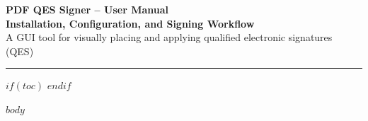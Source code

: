 \documentclass[a4paper,10pt]{article}
\begin{document}
\thispagestyle{fancy}

\begin{center}
  {\LARGE\bfseries\color{qesblue}
    PDF QES Signer -- User Manual}\\[0.5cm]
  {\large\bfseries Installation, Configuration, and Signing Workflow}\\[0.3cm]
  {\small\color{gray}
    A GUI tool for visually placing and applying qualified electronic signatures (QES)}
\end{center}
{\color{qesblue}\rule{\linewidth}{2pt}}
\vspace{0.6cm}

$if(toc)$
{
\hypersetup{linkcolor=qesblue}
\setcounter{tocdepth}{$toc-depth$}
\tableofcontents
\clearpage
}
$endif$

$body$
\end{document}
